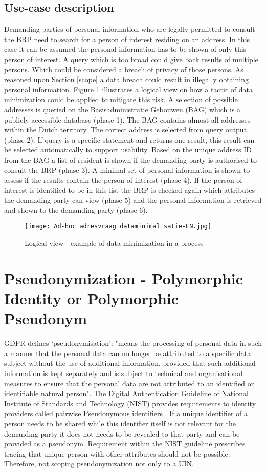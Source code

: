 \subsection{Use-case description}
Demanding parties of personal information who are legally permitted to consult the BRP need to search for a person of interest residing on an address. In this case it can be assumed the personal information has to be shown of only this person of interest. A query which is too broad could give back results of multiple persons. Which could be considered a breach of privacy of those persons. As reasoned upon Section \ref{scope} a data breach could result in illegally obtaining personal information. Figure \ref{fig:Adhoc} illustrates a logical view on how a tactic of data minimization could be applied to mitigate this risk. A selection of possible addresses is queried on the Basisadministratie Gebouwen (BAG) \cite{BAG} which is a publicly accessible database (phase 1). The BAG contains almost all addresses within the Dutch territory. The correct address is selected from query output (phase 2). If query is a specific statement and returns one result, this result can be selected automatically to support usability. Based on the unique address ID from the BAG a list of resident is shown if the demanding party is authorised to consult the BRP (phase 3). A minimal set of personal information is shown to assess if the results contain the person of interest (phase 4). If the person of interest is identified to be in this list the BRP is checked again which attributes the demanding party can view (phase 5) and the personal information is retrieved and shown to the demanding party (phase 6).
\graphicspath{ {./images/} }
\begin{figure}
\centering
\label{fig:Adhoc}
\texttt{[image: Ad-hoc adresvraag dataminimalisatie-EN.jpg]}\\
\caption{Logical view - example of data minimization in a process}
\end{figure}

\section{Pseudonymization - Polymorphic Identity or Polymorphic Pseudonym}
GDPR \cite{GDPR} defines ‘pseudonymisation’: "means the processing of personal data in such a manner that the personal data can no longer be attributed to a specific data subject without the use of additional information, provided that such additional information is kept separately and is subject to technical and organisational measures to ensure that the personal data are not attributed to an identified or identifiable natural person". The Digital Authentication Guideline of National Institute of Standards and Technology (NIST) provides requirements to identity providers called pairwise Pseudonymous identifiers \cite{NIST_800-63C}. If a unique identifier of a person needs to be shared while this identifier itself is not relevant for the demanding party it does not needs to be revealed to that party and can be provided as a pseudonym. Requirement within the NIST guideline prescribes tracing that unique person with other attributes should not be possible. Therefore, not scoping pseudonymization not only to a UIN.

